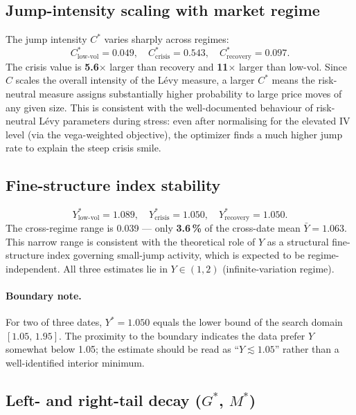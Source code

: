 \documentclass[11pt,a4paper]{article}
\begin{document}
\subsection{Jump-intensity scaling with market regime}

The jump intensity $C^*$ varies sharply across regimes:
\[
  C^*_{\text{low-vol}}  = 0.049,\quad
  C^*_{\text{crisis}}   = 0.543,\quad
  C^*_{\text{recovery}} = 0.097.
\]
The crisis value is \textbf{5.6$\times$} larger than recovery and
\textbf{11$\times$} larger than low-vol.
Since $C$ scales the overall intensity of the L\'{e}vy measure, a larger
$C^*$ means the risk-neutral measure assigns substantially higher probability
to large price moves of any given size.
This is consistent with the well-documented behaviour of risk-neutral
L\'{e}vy parameters during stress: even after normalising for the elevated
IV level (via the vega-weighted objective), the optimizer finds a much
higher jump rate to explain the steep crisis smile.

\subsection{Fine-structure index stability}

\[
  Y^*_{\text{low-vol}} = 1.089,\quad
  Y^*_{\text{crisis}} = 1.050,\quad
  Y^*_{\text{recovery}} = 1.050.
\]
The cross-regime range is 0.039 — only \textbf{3.6\,\%} of the cross-date
mean $\bar Y = 1.063$.
This narrow range is consistent with the theoretical role of $Y$ as a
structural fine-structure index governing small-jump activity, which
is expected to be regime-independent.
All three estimates lie in $Y \in (1,2)$ (infinite-variation regime).

\paragraph{Boundary note.}
For two of three dates, $Y^* = 1.050$ equals the lower bound of the search
domain $[1.05,\, 1.95]$.  The proximity to the boundary indicates the data
prefer $Y$ somewhat below 1.05; the estimate should be read as
``$Y \lesssim 1.05$'' rather than a well-identified interior minimum.

\subsection{Left- and right-tail decay ($G^*$, $M^*$)}
\end{document}
